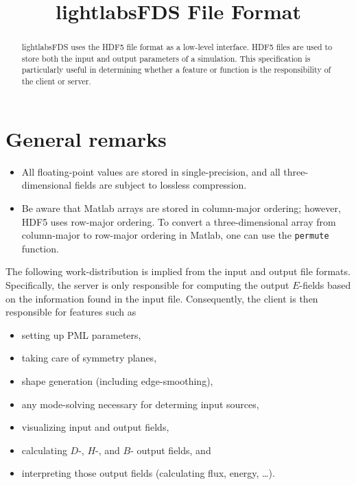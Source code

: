\documentclass{article}
\title{lightlabsFDS File Format}
\newcommand{\T}{\texttt}
\begin{document}
\maketitle
\tableofcontents

\begin{abstract}
lightlabsFDS uses the HDF5 file format as a low-level interface. 
HDF5 files are used to store both the input and output parameters of a 
    simulation.
This specification is particularly useful in determining whether a feature
    or function is the responsibility of the client or server.
\end{abstract}

\section{General remarks}
\begin{itemize}
\item   All floating-point values are stored in single-precision, and all
            three-dimensional fields are subject to lossless compression.
\item   Be aware that Matlab arrays are stored in column-major ordering;
            however, HDF5 uses row-major ordering. 
        To convert a three-dimensional array from column-major to row-major
            ordering in Matlab, one can use the \T{permute} function.
\end{itemize}
The following work-distribution is implied from the input and output
    file formats.
Specifically, the server is only responsible for computing the output 
    $E$-fields based on the information found in the input file.
Consequently, the client is then responsible for features such as
\begin{itemize}
\item   setting up PML parameters,
\item   taking care of symmetry planes, 
\item   shape generation (including edge-smoothing),
\item   any mode-solving necessary for determing input sources,
\item   visualizing input and output fields,
\item   calculating $D$-, $H$-, and $B$- output fields, and 
\item   interpreting those output fields (calculating flux, energy, \ldots).
\end{itemize}
\end{document}
